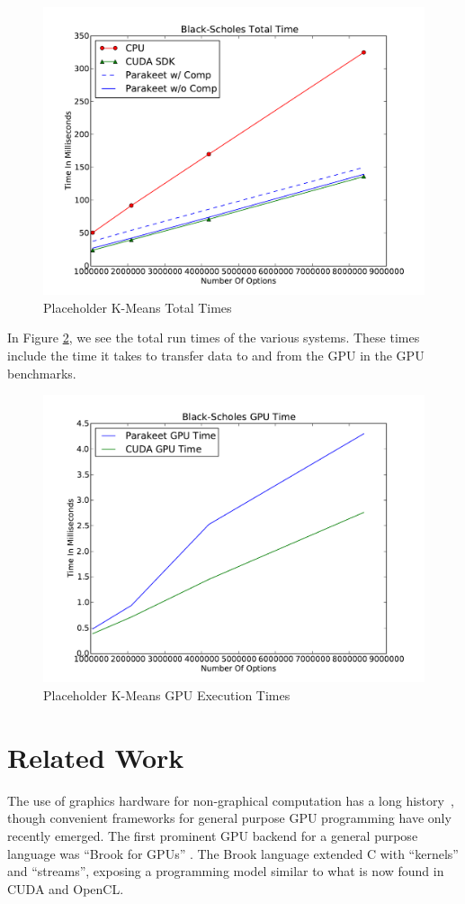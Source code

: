 \documentclass[preprint]{sigplanconf}
\begin{document}
\begin{figure}
\includegraphics[scale=0.45]{BSTotal.pdf}
\caption{Placeholder K-Means Total Times}
\label{BSResults}
\end{figure}

In Figure \ref{BSResults}, we see the total run times of the various systems. These times include the time it takes to transfer data to and from the GPU in the GPU benchmarks.

\begin{figure}
\includegraphics[scale=0.45]{BSGPU.pdf}
\caption{Placeholder K-Means GPU Execution Times}
\label{BSResults}
\end{figure}

\section{Related Work}
\label{RelatedWork}
The use of graphics hardware for non-graphical computation has a  long history~\cite{Leng90}, though convenient frameworks for general purpose GPU programming have only recently emerged. The first prominent GPU backend for a general purpose language was ``Brook for GPUs'' \cite{Buck04}. The Brook language extended C with ``kernels'' and ``streams'', exposing a programming model similar to what is now found in CUDA and OpenCL.
\end{document}
